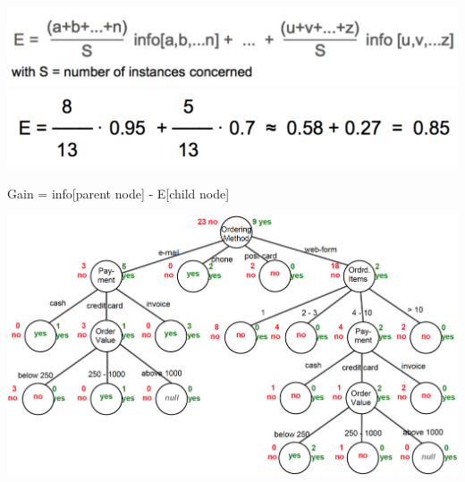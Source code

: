 \begin{breakbox}
\begin{breakbox}
\begin{center}
\includegraphics[width=.15\textwidth]{slides_images/entropy}
\includegraphics[width=.15\textwidth]{slides_images/entropy_example}
\end{center}
\end{breakbox}

\begin{breakbox}
\newline Gain = info[parent node] - E[child node]
\end{breakbox}

\begin{center}
\includegraphics[width=.15\textwidth]{slides_images/id3_tree}
\end{center}

\end{breakbox}


